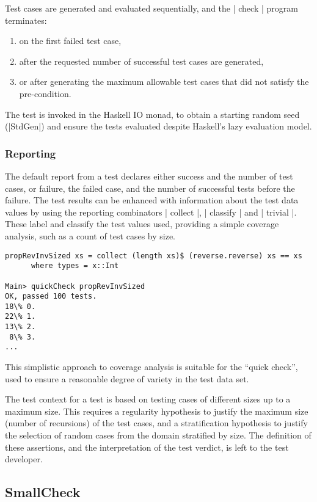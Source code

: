 Test cases are generated and evaluated sequentially,
and the | check | program terminates:
\begin{enumerate}
\item on the first failed test case,
\item after the requested number of successful test cases are generated,
\item or after generating the maximum allowable test cases that did not satisfy the pre-condition.
\end{enumerate}
\noindent
The test is invoked in the Haskell IO monad,
to obtain a starting random seed (|StdGen|)
and ensure the tests evaluated despite Haskell's lazy evaluation model.

\subsubsection{Reporting}

The default report from a test declares either success and the number of test cases,
or failure, the failed case, and the number of successful tests before the failure.
The test results can be enhanced with
information about the test data values
by using the reporting combinators | collect |, | classify | and | trivial |.
These label and classify the test values used,
providing a simple coverage analysis, 
such as a count of test cases by size.

\begin{lstlisting}
propRevInvSized xs = collect (length xs)$ (reverse.reverse) xs == xs
	  where types = x::Int

Main> quickCheck propRevInvSized
OK, passed 100 tests.
18\% 0.
22\% 1.
13\% 2.
 8\% 3.
...

\end{lstlisting}

\noindent
This simplistic approach to coverage analysis
is suitable for the ``quick check'',
used to ensure a reasonable degree of variety in the test data set.

The test context for a \QC test is based on
testing cases of different sizes up to a maximum size.
This requires a regularity hypothesis to 
justify the maximum size (number of recursions) of the test cases,
and a stratification hypothesis to justify 
the selection of random cases from the domain stratified by size.
The definition of these assertions,
and the interpretation of the test verdict,
is left to the test developer.

\subsection{SmallCheck}\label{sub:easycheck}

